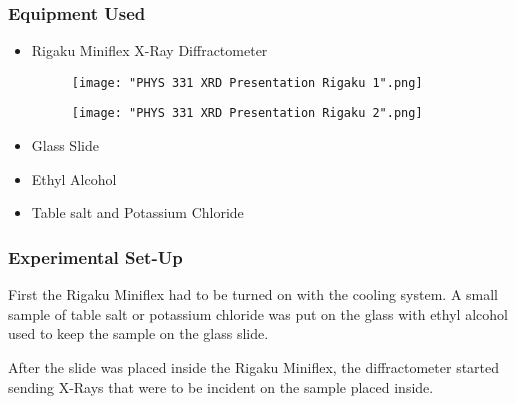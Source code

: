 \documentclass{beamer}
\begin{document}
\begin{frame}
\frametitle{Equipment Used}
\begin{itemize}
\item{Rigaku Miniflex X-Ray Diffractometer}
\begin{figure}[!htb]
\begin{minipage}{0.2\textwidth}
\centering
\texttt{[image: "PHYS 331 XRD Presentation Rigaku 1".png]}
\end{minipage}\hspace{75pt}
\begin{minipage}{0.2\textwidth}
\centering
\texttt{[image: "PHYS 331 XRD Presentation Rigaku 2".png]}
\end{minipage}
\end{figure}
\item{Glass Slide}
\item{Ethyl Alcohol}
\item{Table salt and Potassium Chloride}
\end{itemize}
\end{frame}


\begin{frame}
\frametitle{Experimental Set-Up}
First the Rigaku Miniflex had to be turned on with the cooling system. A small sample of table salt or potassium chloride was put on the glass with ethyl alcohol used to keep the sample on the glass slide.
\newline

After the slide was placed inside the Rigaku Miniflex, the diffractometer started sending X-Rays that were to be incident on the sample placed inside. 
\end{frame}

\end{document}
